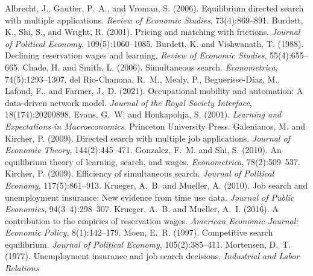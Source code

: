 \documentclass[11pt]{article}
\begin{document}

\begin{thebibliography}{}
Albrecht, J., Gautier, P.~A., and Vroman, S. (2006). Equilibrium directed search with multiple applications.
\textit{Review of Economic Studies}, 73(4):869--891.
Burdett, K., Shi, S., and Wright, R. (2001). Pricing and matching with frictions. \textit{Journal of Political
Economy}, 109(5):1060--1085.
Burdett, K. and Vishwanath, T. (1988). Declining reservation wages and learning. \textit{Review of Economic Studies},
55(4):655--665.
Chade, H. and Smith, L. (2006). Simultaneous search. \textit{Econometrica}, 74(5):1293--1307.
del Rio-Chanona, R.~M., Mealy, P., Beguerisse-D{\'i}az, M., Lafond, F., and Farmer, J.~D. (2021). Occupational
mobility and automation: A data-driven network model. \textit{Journal of the Royal Society Interface},
18(174):20200898.
Evans, G.~W. and Honkapohja, S. (2001). \textit{Learning and Expectations in Macroeconomics}. Princeton University
Press.
Galenianos, M. and Kircher, P. (2009). Directed search with multiple job applications. \textit{Journal of Economic
Theory}, 144(2):445--471.
Gonzalez, F.~M. and Shi, S. (2010). An equilibrium theory of learning, search, and wages. \textit{Econometrica},
78(2):509--537.
Kircher, P. (2009). Efficiency of simultaneous search. \textit{Journal of Political Economy}, 117(5):861--913.
Krueger, A.~B. and Mueller, A. (2010). Job search and unemployment insurance: New evidence from time use data.
\textit{Journal of Public Economics}, 94(3--4):298--307.
Krueger, A.~B. and Mueller, A.~I. (2016). A contribution to the empirics of reservation wages. \textit{American
Economic Journal: Economic Policy}, 8(1):142--179.
Moen, E.~R. (1997). Competitive search equilibrium. \textit{Journal of Political Economy}, 105(2):385--411.
Mortensen, D.~T. (1977). Unemployment insurance and job search decisions. \textit{Industrial and Labor Relations
}
\end{thebibliography}
\end{document}
